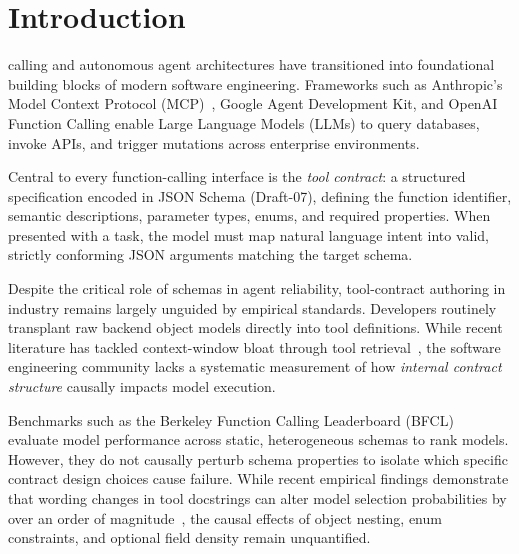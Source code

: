 \documentclass[10pt,conference]{IEEEtran}
\begin{document}
\section{Introduction}
 calling and autonomous agent architectures have transitioned into foundational building blocks of modern software engineering. Frameworks such as Anthropic's Model Context Protocol (MCP)~\cite{anthropic2024mcp}, Google Agent Development Kit, and OpenAI Function Calling enable Large Language Models (LLMs) to query databases, invoke APIs, and trigger mutations across enterprise environments. 

Central to every function-calling interface is the \textit{tool contract}: a structured specification encoded in JSON Schema (Draft-07), defining the function identifier, semantic descriptions, parameter types, enums, and required properties. When presented with a task, the model must map natural language intent into valid, strictly conforming JSON arguments matching the target schema.

Despite the critical role of schemas in agent reliability, tool-contract authoring in industry remains largely unguided by empirical standards. Developers routinely transplant raw backend object models directly into tool definitions. While recent literature has tackled context-window bloat through tool retrieval~\cite{patil2025bfcl, sakizli2026rag, babu2026toolchoice}, the software engineering community lacks a systematic measurement of how \textit{internal contract structure} causally impacts model execution.

Benchmarks such as the Berkeley Function Calling Leaderboard (BFCL)~\cite{patil2025bfcl} evaluate model performance across static, heterogeneous schemas to rank models. However, they do not causally perturb schema properties to isolate which specific contract design choices cause failure. While recent empirical findings demonstrate that wording changes in tool docstrings can alter model selection probabilities by over an order of magnitude~\cite{toolpreferences2025emnlp}, the causal effects of object nesting, enum constraints, and optional field density remain unquantified.
\end{document}

